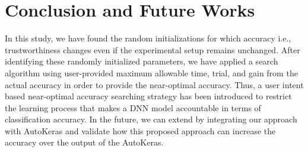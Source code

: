 \section{Conclusion and Future Works}
\label{sec:future}
In this study, we have found the random initializations for which accuracy i.e., trustworthiness changes even if the experimental setup remains unchanged. After identifying these randomly initialized parameters, we have applied a search algorithm using user-provided maximum allowable time, trial, and gain from the actual accuracy in order to provide the near-optimal accuracy.
Thus, a user intent based near-optimal accuracy searching strategy has been introduced to restrict the learning process that makes a DNN model accountable in terms of classification accuracy. In the future, we can extend by integrating our approach with AutoKeras \cite{jin2019auto} and validate how this proposed approach can increase the accuracy over the output of the AutoKeras.

